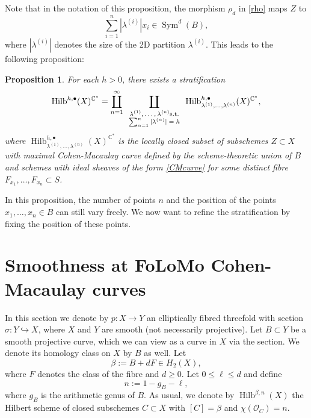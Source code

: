 \documentclass{amsart}
\newtheorem{proposition}[theorem]{Proposition}
\theoremstyle{definition}
\newcommand{\CC} {\mathbb{C}}          %
\renewcommand{\O}{\mathcal{O}}
\newcommand{\Sym}{\operatorname{Sym}}
\newcommand{\Hilb}{\operatorname{Hilb}}
\begin{document}
Note that in the notation of this proposition, the morphism $\rho_d$ in \eqref{rho} maps $Z$ to
$$
\sum_{i=1}^{n} |\lambda^{(i)}| x_i \in \Sym^d(B),
$$
where $|\lambda^{(i)}|$ denotes the size of the 2D partition $\lambda^{(i)}$.
This leads to the following proposition:
\begin{proposition} \label{C^*}
For each $h>0$, there exists a stratification
$$
\Hilb^{h,\bullet}(X)^{\CC^*} = \coprod_{n=1}^{\infty} \coprod_{{\scriptsize{\begin{array}{c} \lambda^{(1)}, \ldots, \lambda^{(n)} \mathrm{s.t.} \\ \sum_{\alpha=1}^{n} |\lambda^{(\alpha)}| = h \end{array}}}} \Hilb^{h,\bullet}_{\lambda^{(1)}, \ldots, \lambda^{(n)}}(X)^{\CC^*},
$$
where $\Hilb^{h,\bullet}_{\lambda^{(1)}, \ldots, \lambda^{(n)}}(X)^{\CC^*}$ is the locally closed subset of subschemes $Z \subset X$ with maximal Cohen-Macaulay curve defined by the scheme-theoretic union of $B$ and schemes with ideal sheaves of the form \eqref{CMcurve} for some distinct fibre $F_{x_1}, \ldots, F_{x_n} \subset S$.
\end{proposition}

In this proposition, the number of points $n$ and the position of the points $x_1, \ldots, x_n \in B$ can still vary freely. We now want to refine the stratification by fixing the position of these points.


\section{Smoothness at FoLoMo Cohen-Macaulay curves}

In this section we denote by $p : X \rightarrow Y$ an elliptically fibred threefold with section $\sigma : Y \hookrightarrow X$, where $X$ and $Y$ are smooth (not necessarily projective). Let $B \subset Y$ be a smooth projective curve, which we can view as a curve in $X$ via the section. We denote its homology class on $X$ by $B$ as well. Let
\[
\beta := B + d F \in H_2(X),
\]
where $F$ denotes the class of the fibre and $d \geq 0$. Let $0 \leq \ell \leq d$ and define 
\begin{equation} \label{defn}
n :=  1-g_B - \ell,
\end{equation}
where $g_B$ is the arithmetic genus of $B$. As usual, we denote by $\Hilb^{\beta,n}(X)$ the Hilbert scheme of closed subschemes $C \subset X$ with $[C] = \beta$ and $\chi(\O_C) = n$. 
\end{document}
